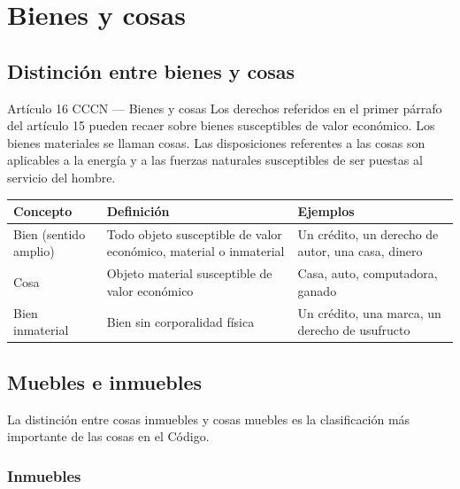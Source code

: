 \documentclass[12pt,oneside]{book}
\newenvironment{tabla}{%
    \par\medskip\begingroup\small\renewcommand{\arraystretch}{1.3}\noindent\ignorespaces
}{%
    \par\endgroup\medskip
}
\begin{document}
\chapter{Bienes y cosas}

\section{Distinción entre bienes y cosas}

\begin{norma}{Artículo 16 CCCN --- Bienes y cosas}
Los derechos referidos en el primer párrafo del artículo 15 pueden recaer sobre bienes susceptibles de valor económico. Los bienes materiales se llaman cosas. Las disposiciones referentes a las cosas son aplicables a la energía y a las fuerzas naturales susceptibles de ser puestas al servicio del hombre.
\end{norma}

\begin{tabla}
\begin{tabularx}{\textwidth}{B{3.4cm}YY}
\toprule
Concepto & \textbf{Definición} & \textbf{Ejemplos} \\
\midrule
Bien (sentido amplio) & Todo objeto susceptible de valor económico, material o inmaterial & Un crédito, un derecho de autor, una casa, dinero \\
Cosa & Objeto material susceptible de valor económico & Casa, auto, computadora, ganado \\
Bien inmaterial & Bien sin corporalidad física & Un crédito, una marca, un derecho de usufructo \\
\bottomrule
\end{tabularx}
\end{tabla}

\section{Muebles e inmuebles}

La distinción entre cosas inmuebles y cosas muebles es la clasificación más importante de las cosas en el Código.

\subsection{Inmuebles}
\end{document}
